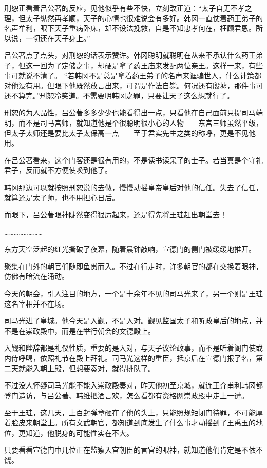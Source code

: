 刑恕正看着吕公著的反应，见他似乎有些不快，立刻改正道：“太子自无不孝之理，但太子纵然再孝顺，天子的心情也很难说会有多好。韩冈一直仗着药王弟子的名声牟利，眼下天子重病卧床，却不设法挽救，自是不知忠孝何在，枉顾君恩。所以说，一切还在天子身上。”

吕公著点了点头，对刑恕的话表示赞许。韩冈聪明就聪明在从来不承认什么药王弟子，但这一回为了定储之事，却硬是拿了药王庙来发配两位亲王。这样一来，有些事可就说不清了。
“若韩冈不是总是拿着药王弟子的名声来诓骗世人，什么计策都对他没有用。但眼下他既然放言出来，可谓是作法自毙。何况还有殷墟，那件事可还不算完。”刑恕冷笑道。不需要明韩冈之罪，只要让天子这么想就行了。

刑恕的为人品性，吕公著多多少少也能看得出一点，只看他在自己面前只提司马端明，而不是司马宫师，就知道他是个很聪明很小心的人物——东宫三师虽然平级，但太子太师还是要比太子太保高一点——至于君实先生之类的称呼，更是不见他用。

在吕公著看来，这个门客还是很有用的，不是读书读呆了的士子。若当真是个守礼君子，反而就不方便使唤到他了。

韩冈那边可以就按照刑恕说的去做，慢慢动摇皇帝皇后对他的信任。失去了信任，就算还是太子师，也不用担心日后。

而眼下，吕公著眼神陡然变得狠厉起来，还是得先将王珪赶出朝堂去！

……………………

东方天空泛起的红光撕破了夜幕，随着晨钟敲响，宣德门的侧门被缓缓地推开。

聚集在门外的朝官们随即鱼贯而入。不过在行走时，许多朝官的都在交换着眼神，仿佛有暗流在涌动。

今天的朝会，引人注目的地方，一个是十余年不见的司马光来了，另一个则是王珪这名宰相并不在场。

司马光进了皇城。他今天是入觐，不是入对。觐见监国太子和听政皇后的地点，并不是在崇政殿中，而是在举行朝会的文德殿上。

入觐和陛辞都是礼仪性质，重要的是入对，与天子议论政事，而不是听着阁门使或内侍呼喝，依照礼节在殿上拜礼。司马光这样的重臣，抵京后在宣德门报了名，第二天就能入朝上殿，但想要奏对，就得排队了。

不过没人怀疑司马光能不能入崇政殿奏对，昨天他初至京城，就连王介甫利韩冈都登门造访，与吕公著、韩维把酒言欢，怎么看都有资格网崇政殿中走上一遭。

至于王珪，这几天，上百封弹章砸在了他的头上，只能照规矩闭门待罪，不可能厚着脸皮来朝堂上。所有文武朝官，都知道到底发生了什么事才动摇到了王禹玉的地位，更知道，他脱身的可能性实在不大。

只要看看宣德门中几位正在监察入宫朝臣的言官的眼神，就知道他们肯定是不依不饶。

